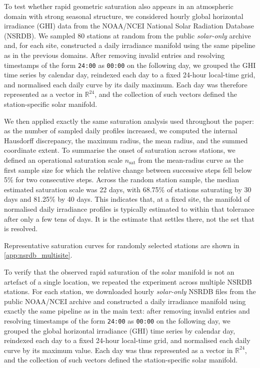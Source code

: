 \documentclass[10pt]{article}
\theoremstyle{plain}
\theoremstyle{definition}
\theoremstyle{remark}
\begin{document}
To test whether rapid geometric saturation also appears in an
atmospheric domain with strong seasonal structure, we considered
hourly global horizontal irradiance (GHI) data from the NOAA/NCEI
National Solar Radiation Database (NSRDB). We sampled 80 stations at
random from the public \emph{solar-only} archive and, for each site,
constructed a daily irradiance manifold using the same pipeline as in
the previous domains. After removing invalid entries and resolving
timestamps of the form \texttt{24:00} as \texttt{00:00} on the following
day, we grouped the GHI time series by calendar day, reindexed each day
to a fixed 24-hour local-time grid, and normalised each daily curve by
its daily maximum. Each day was therefore represented as a vector in
$\mathbb{R}^{24}$, and the collection of such vectors defined the
station-specific solar manifold. 

We then applied exactly the same saturation analysis used throughout the
paper: as the number of sampled daily profiles increased, we computed
the internal Hausdorff discrepancy, the maximum radius, the mean radius,
and the summed coordinate extent. To summarise the onset of saturation across
stations, we defined an operational saturation scale
$n_{\mathrm{sat}}$ from the mean-radius curve as the first sample size
for which the relative change between successive steps fell below 5\%
for two consecutive steps. Across the random station sample, the median
estimated saturation scale was 22 days, with 68.75\% of stations
saturating by 30 days and 81.25\% by 40 days. This indicates that, at a
fixed site, the manifold of normalised daily irradiance profiles is
typically estimated to within that tolerance after only a few tens of days. It
is the estimate that settles there, not the set that is resolved.

Representative saturation curves for randomly selected stations are
shown in \ref{app:nsrdb_multisite}.


\label{app:nsrdb_multisite}

To verify that the observed rapid saturation of the solar manifold is
not an artefact of a single location, we repeated the experiment across
multiple NSRDB stations. For each station, we downloaded hourly
\emph{solar-only} NSRDB files from the public NOAA/NCEI archive and
constructed a daily irradiance manifold using exactly the same pipeline
as in the main text: after removing invalid entries and resolving
timestamps of the form \texttt{24:00} as \texttt{00:00} on the following
day, we grouped the global horizontal irradiance (GHI) time series by
calendar day, reindexed each day to a fixed 24-hour local-time grid,
and normalised each daily curve by its maximum value. Each day was thus
represented as a vector in $\mathbb{R}^{24}$, and the collection of such
vectors defined the station-specific solar manifold.
\end{document}
